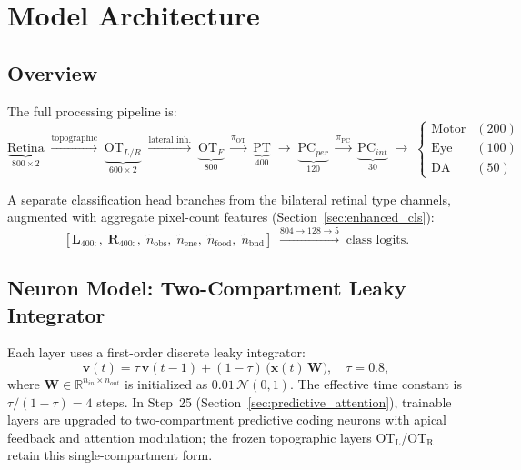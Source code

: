 \documentclass[11pt,a4paper]{article}
\begin{document}
\section{Model Architecture}\label{sec:arch}

\subsection{Overview}

The full processing pipeline is:
\[
  \underbrace{\text{Retina}}_{\text{800}\times 2}
  \;\xrightarrow{\text{topographic}}\;
  \underbrace{\text{OT}_{L/R}}_{\text{600}\times 2}
  \;\xrightarrow{\text{lateral inh.}}\;
  \underbrace{\text{OT}_F}_{800}
  \;\xrightarrow{\pi_\text{OT}}\;
  \underbrace{\text{PT}}_{400}
  \;\rightarrow\;
  \underbrace{\text{PC}_{per}}_{120}
  \;\xrightarrow{\pi_\text{PC}}\;
  \underbrace{\text{PC}_{int}}_{30}
  \;\rightarrow\;
  \begin{cases}
    \text{Motor} & (200) \\
    \text{Eye}   & (100) \\
    \text{DA}    & (50)
  \end{cases}
\]

A separate classification head branches from the bilateral retinal type
channels, augmented with aggregate pixel-count features
(Section~\ref{sec:enhanced_cls}):
\[
  [\mathbf{L}_{400:},\; \mathbf{R}_{400:},\;
   \tilde{n}_\text{obs},\; \tilde{n}_\text{ene},\;
   \tilde{n}_\text{food},\; \tilde{n}_\text{bnd}]
  \;\xrightarrow{804 \to 128 \to 5}\;
  \text{class logits}.
\]

\subsection{Neuron Model: Two-Compartment Leaky Integrator}

Each layer uses a first-order discrete leaky integrator:
\begin{equation}\label{eq:twocomp}
  \mathbf{v}(t) = \tau\,\mathbf{v}(t-1) + (1-\tau)\,\bigl(\mathbf{x}(t)\,\mathbf{W}\bigr),
  \quad \tau = 0.8,
\end{equation}
where $\mathbf{W} \in \mathbb{R}^{n_{in}\times n_{out}}$ is initialized as
$0.01\,\mathcal{N}(0,1)$.
The effective time constant is $\tau/(1-\tau)=4$ steps.
In Step~25 (Section~\ref{sec:predictive_attention}), trainable layers are
upgraded to two-compartment predictive coding neurons with apical feedback
and attention modulation; the frozen topographic layers
OT$_\text{L}$/OT$_\text{R}$ retain this single-compartment form.
\end{document}
